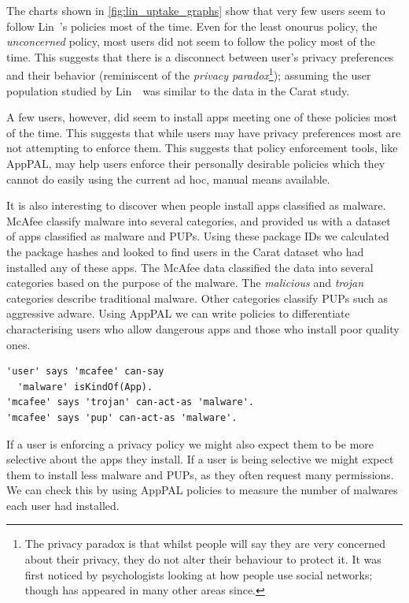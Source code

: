 \documentclass[thesis.tex]{subfiles}
\begin{document}
The charts shown in \autoref{fig:lin_uptake_graphs} show that very few
users seem to follow Lin~\etal's policies most of the
time.  Even for the least onourus policy,
the \emph{unconcerned} policy, most users did not seem to follow the
policy most of the time.  This suggests that there is a disconnect
between user's privacy preferences and their behavior (reminiscent of
the \emph{privacy paradox}\footnote{The privacy paradox is that whilst
people will say they are very concerned about their privacy, they do
not alter their behaviour to protect it.  It was first noticed by
psychologists looking at how people use social networks; though has
appeared in many other areas since.}); assuming the user population
studied by Lin~\etal~was similar to the data in the Carat study.

A few users, however, did seem to install apps meeting one of these
policies most of the time.  This suggests that while users may have
privacy preferences most are not attempting to enforce them.  This
suggests that policy enforcement tools, like AppPAL, may help users
enforce their personally desirable policies which they cannot do
easily using the current ad hoc, manual means available.

It is also interesting to discover when people install apps classified
as malware.  McAfee classify malware into several categories, and
provided us with a dataset of apps classified as malware and
\acp{PUP}. Using these package IDs we calculated the package hashes
and looked to find users in the Carat dataset who had installed any of
these apps.  The McAfee data classified the data into several
categories based on the purpose of the malware.  The \emph{malicious}
and \emph{trojan} categories describe traditional malware.  Other
categories classify \acp{PUP} such as aggressive adware.  Using AppPAL
we can write policies to differentiate characterising users who allow
dangerous apps and those who install poor quality ones.

\begin{lstlisting}
'user' says 'mcafee' can-say
  'malware' isKindOf(App).
'mcafee' says 'trojan' can-act-as 'malware'.
'mcafee' says 'pup' can-act-as 'malware'.
\end{lstlisting}

If a user is enforcing a privacy policy we might also expect them to
be more selective about the apps they install.  If a user is being
selective we might expect them to install less malware and \acp{PUP},
as they often request many permissions. We can check this by using
AppPAL policies to measure the number of malwares each user had
installed.
\end{document}
